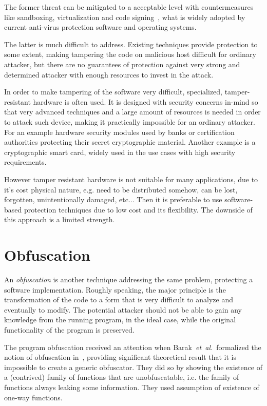 \documentclass[11pt,oneside,final]{fithesis2}
\newcommand{\eal}{\emph{et~al.}}
\begin{document}
    The former threat can be mitigated to a acceptable level with countermeasures like sandboxing, virtualization and code signing~\citep{Menezes:1996:HAC:548089},
    what is widely adopted by current anti-virus protection software and operating systems.
    
    The latter is much difficult
    to address. Existing techniques provide protection to some extent, making tampering the code on malicious host difficult for ordinary attacker,
    but there are no guarantees of protection against very strong and determined attacker with enough resources to invest in the attack.
    
    In order to make tampering of the software very difficult, specialized, tamper-resistant hardware is often used.
    It is designed with security concerns in-mind so that very advanced techniques and a large amount of resources is needed in order to attack such device,
    making it practically impossible for an ordinary attacker. For an example hardware security modules used by banks or certification 
    authorities protecting their secret cryptographic material. Another example is a cryptographic smart card, widely used in the use 
    cases with high security requirements.    

    However tamper resistant hardware is not suitable for many applications, due to it's cost physical nature, e.g. need to be distributed somehow, 
    can be lost, forgotten, unintentionally damaged, etc...
    Then it is preferable to use software-based protection techniques due to low cost and its flexibility. The downside of this approach is a limited strength.
    
    \section{Obfuscation}\label{sec:obfuscation}
    An \emph{obfuscation} is another technique addressing the same problem, protecting a software implementation. 
    Roughly speaking, the major principle is the transformation of the code to a form that is very difficult 
    to analyze and eventually to modify. The potential attacker should not be able to gain any knowledge from the running program, 
    in the ideal case, while the original functionality of the program is preserved.

    The program obfuscation received an attention when Barak~\eal~formalized the notion of obfuscation
    in~\citep{Barak:2012:POP:2160158.2160159}, providing significant theoretical result
    that it is impossible to create a generic obfuscator. They did so by showing the existence of a (contrived) family of functions that 
    are unobfuscatable, i.e. the family of functions always leaking some information. They used assumption of existence of one-way functions.
\end{document}
